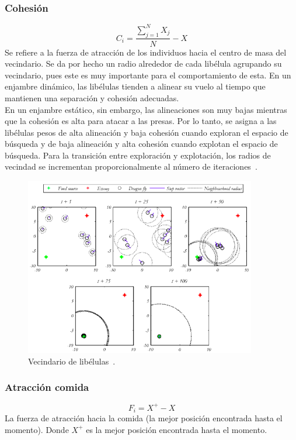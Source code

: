 \subsubsection{Cohesión}
\begin{equation}
    C_i = \frac{\sum_{j=1}^N X_j}{N} - X
\end{equation}
Se refiere a la fuerza de atracción de los individuos hacia el centro de masa del vecindario. Se da por hecho un radio alrededor de cada libélula agrupando su vecindario, pues este es muy importante para el comportamiento de esta. En un enjambre dinámico, las libélulas tienden a alinear su vuelo al tiempo que mantienen una separación y cohesión adecuadas.\\[6pt]
En un enjambre estático, sin embargo, las alineaciones son muy bajas mientras que la cohesión es alta para atacar a las presas. Por lo tanto, se asigna a las libélulas pesos de alta alineación y baja cohesión cuando exploran el espacio de búsqueda y de baja alineación y alta cohesión cuando explotan el espacio de búsqueda. Para la transición entre exploración y explotación, los radios de vecindad se incrementan proporcionalmente al número de iteraciones~\cite{mirjalili_dragonfly_2016}.
\begin{figure}[htp]
    \centering
    \includegraphics[width=0.9\textwidth]{imagenes/da-operators.png}
    \caption[Vecindario de libélulas]{Vecindario de libélulas~\cite{mirjalili_dragonfly_2016}.}
\end{figure}

\subsubsection{Atracción comida}
\begin{equation}
    F_i = X^+ - X
\end{equation}
La fuerza de atracción hacia la comida (la mejor posición encontrada hasta el momento). Donde $X^+$ es la mejor posición encontrada hasta el momento.

